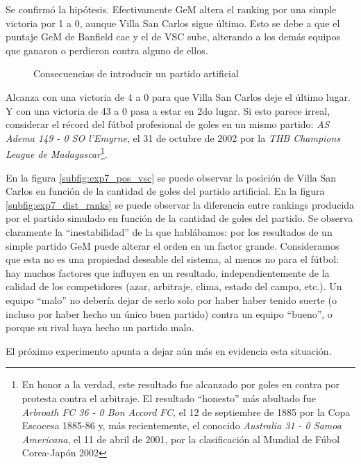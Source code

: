 \par Se confirmó la hipótesis. Efectivamente GeM altera el ranking por una
simple victoria por 1 a 0, aunque Villa San Carlos sigue último. Esto se debe a
que el puntaje GeM de Banfield cae y el de VSC sube, alterando a los demás
equipos que ganaron o perdieron contra alguno de ellos.

\begin{figure}[H]
    \caption{Consecuencias de introducir un partido artificial}
    \centering
    \hspace{2pt}
\end{figure}

\par Alcanza con una victoria de 4 a 0 para que Villa San Carlos deje el último
lugar. Y con una victoria de 43 a 0 pasa a estar en 2do lugar. Si esto parece
irreal, considerar el récord del fútbol profesional de goles en un mismo
partido: \emph{AS Adema 149 - 0 SO l'Emyrne}, el 31 de octubre de 2002 por la
\emph{THB Champions League de Madagascar}\footnote{En honor a la verdad, este
resultado fue alcanzado por goles en contra por protesta contra el arbitraje.
El resultado ``honesto'' más abultado fue \emph{Arbroath FC 36 - 0 Bon Accord
FC}, el 12 de septiembre de 1885 por la Copa Escocesa 1885-86 y, más
recientemente, el conocido \emph{Australia 31 - 0 Samoa Americana}, el 11 de
abril de 2001, por la clasificación al Mundial de Fúbol Corea-Japón 2002}.

\par En la figura \ref{subfig:exp7_pos_vsc} se puede observar la posición de
Villa San Carlos en función de la cantidad de goles del partido artificial. En
la figura \ref{subfig:exp7_dist_ranks} se puede observar la diferencia entre
rankings producida por el partido simulado en función de la cantidad de goles
del partido. Se observa claramente la ``inestabilidad'' de la que hablábamos:
por los resultados de un simple partido GeM puede alterar el orden en un factor
grande. Consideramos que esta no es una propiedad deseable del sistema, al
menos no para el fútbol: hay muchos factores que influyen en un resultado,
independientemente de la calidad de los competidores (azar, arbitraje, clima,
estado del campo, etc.). Un equipo ``malo'' no debería dejar de serlo solo por
haber haber tenido suerte (o incluso por haber hecho un único buen partido)
contra un equipo ``bueno'', o porque su rival haya hecho un partido malo.

\par El próximo experimento apunta a dejar aún más en evidencia esta situación.
